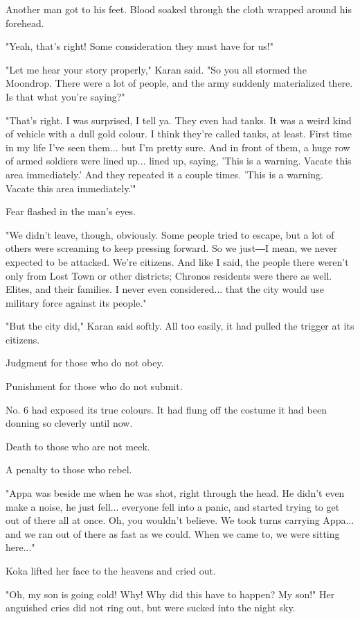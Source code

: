 Another man got to his feet. Blood soaked through the cloth wrapped
around his forehead.

"Yeah, that's right! Some consideration they must have for us!"

"Let me hear your story properly," Karan said. "So you all stormed the
Moondrop. There were a lot of people, and the army suddenly materialized
there. Is that what you're saying?"

"That's right. I was surprised, I tell ya. They even had tanks. It was a
weird kind of vehicle with a dull gold colour. I think they're called
tanks, at least. First time in my life I've seen them... but I'm pretty
sure. And in front of them, a huge row of armed soldiers were lined
up... lined up, saying, 'This is a warning. Vacate this area
immediately.' And they repeated it a couple times. 'This is a warning.
Vacate this area immediately.'"

Fear flashed in the man's eyes.

"We didn't leave, though, obviously. Some people tried to escape, but a
lot of others were screaming to keep pressing forward. So we just―I
mean, we never expected to be attacked. We're citizens. And like I said,
the people there weren't only from Lost Town or other districts; Chronos
residents were there as well. Elites, and their families. I never even
considered... that the city would use military force against its
people."

"But the city did," Karan said softly. All too easily, it had pulled the
trigger at its citizens.

Judgment for those who do not obey.

Punishment for those who do not submit.

No. 6 had exposed its true colours. It had flung off the costume it had
been donning so cleverly until now.

Death to those who are not meek.

A penalty to those who rebel.

"Appa was beside me when he was shot, right through the head. He didn't
even make a noise, he just fell... everyone fell into a panic, and
started trying to get out of there all at once. Oh, you wouldn't
believe. We took turns carrying Appa... and we ran out of there as fast
as we could. When we came to, we were sitting here..."

Koka lifted her face to the heavens and cried out.

"Oh, my son is going cold! Why! Why did this have to happen? My son!"
Her anguished cries did not ring out, but were sucked into the night
sky.


